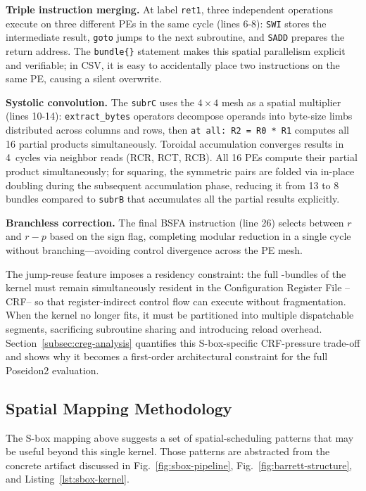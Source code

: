\textbf{Triple instruction merging.} At label \texttt{ret1}, three independent operations execute on three different PEs in the same cycle (lines 6-8): \texttt{SWI} stores the intermediate result, \texttt{goto} jumps to the next subroutine, and \texttt{SADD} prepares the return address. The \texttt{bundle\{\}} statement makes this spatial parallelism explicit and verifiable; in CSV, it is easy to accidentally place two instructions on the same PE, causing a silent overwrite.

\textbf{Systolic convolution.} The \texttt{subrC} uses the $4\!\times\!4$ mesh as a spatial multiplier (lines 10-14): \texttt{extract\_bytes} operators decompose operands into byte-size limbs distributed across columns and rows, then \mbox{\texttt{at all: R2 = R0 * R1}} computes all 16 partial products simultaneously. Toroidal accumulation converges results in 4~cycles via neighbor reads (RCR, RCT, RCB). All 16 PEs compute their partial product simultaneously; for squaring, the symmetric pairs are folded via in-place doubling during the subsequent accumulation phase, reducing it from 13 to 8 bundles compared to \texttt{subrB} that accumulates all the partial results explicitly.

\textbf{Branchless correction.} The final BSFA instruction (line 26) selects between $r$ and $r - p$ based on the sign flag, completing modular reduction in a single cycle without branching---avoiding control divergence across the PE mesh.

The jump-reuse feature imposes a residency constraint: the full \MetricSboxKernelResidentBundles-bundles of the kernel must remain simultaneously resident in the Configuration Register File --CRF-- so that register-indirect control flow can execute without fragmentation. When the kernel no longer fits, it must be partitioned into multiple dispatchable segments, sacrificing subroutine sharing and introducing reload overhead. Section~\ref{subsec:creg-analysis} quantifies this S-box-specific CRF-pressure trade-off and shows why it becomes a first-order architectural constraint for the full Poseidon2 evaluation.

\subsection{Spatial Mapping Methodology}
\label{subsec:spatial-mapping}

The S-box mapping above suggests a set of spatial-scheduling patterns that may be useful beyond this single kernel. Those patterns are abstracted from the concrete artifact discussed in Fig.~\ref{fig:sbox-pipeline}, Fig.~\ref{fig:barrett-structure}, and Listing~\ref{lst:sbox-kernel}. 




